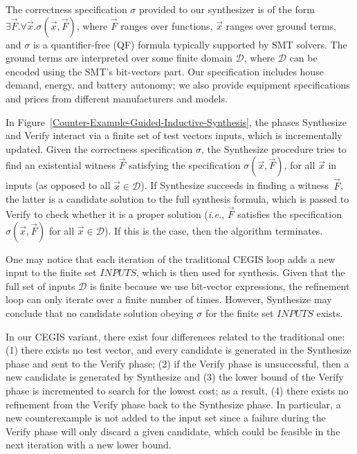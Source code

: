 \documentclass[10pt,journal,compsoc]{IEEEtran}
\begin{document}
The correctness specification $\sigma$ provided to our synthesizer is of the form $\exists \vec{F}. \forall \vec{x}. \sigma(\vec{x}, \vec{F})$, where $\vec{F}$ ranges over functions, $\vec{x}$ ranges over ground terms, and $\sigma$ is a quantifier-free (QF) formula typically supported by SMT solvers. The ground terms are interpreted over some finite domain $\mathcal{D}$, where $\mathcal{D}$ can be encoded using the SMT's bit-vectors part. Our specification includes house demand, energy, and battery autonomy; we also provide equipment specifications and prices from different manufacturers and models.

In Figure~\ref{Counter-Example-Guided-Inductive-Synthesis}, the phases {\sc Synthesize} and {\sc Verify} interact via a finite set of test vectors {\sc inputs}, which is incrementally updated. Given the correctness specification $\sigma$, the {\sc Synthesize} procedure tries to find an existential witness $\vec{F}$ satisfying the specification $\sigma(\vec{x}, \vec{F})$, for all $\vec{x}$ in {\sc inputs} (as opposed to all $\vec{x} \in \mathcal{D}$). If {\sc Synthesize} succeeds in finding a witness~$\vec{F}$, the latter is a candidate solution to the full synthesis formula, which is passed to {\sc Verify} to check whether it is a proper solution ({\it i.e.}, $\vec{F}$ satisfies the specification $\sigma(\vec{x}, \vec{F})$ for all $\vec{x}\in\mathcal{D}$). If this is the case, then the algorithm terminates.

One may notice that each iteration of the traditional CEGIS loop adds a new input to the finite set $INPUTS$, which is then used for synthesis. Given that the full set of inputs $\mathcal{D}$ is finite because we use bit-vector expressions, the refinement loop can only iterate over a finite number of times. However, {\sc Synthesize} may conclude that no candidate solution obeying $\sigma$ for the finite set $INPUTS$ exists. 

In our CEGIS variant, there exist four differences related to the traditional one: 
(1) there exists no test vector, and every candidate is generated in the {\sc Synthesize} phase and sent to the {\sc Verify} phase; 
(2) if the {\sc Verify} phase is unsuccessful, then a new candidate is generated by {\sc Synthesize} and 
(3) the lower bound of the {\sc Verify} phase is incremented to search for the lowest cost; as a result,
(4) there exists no refinement from the {\sc Verify} phase back to the {\sc Synthesize} phase. In particular, a new counterexample is not added to the {\sc input} set since a failure during the {\sc Verify} phase will only discard a given candidate, which could be feasible in the next iteration with a new lower bound.
\end{document}
